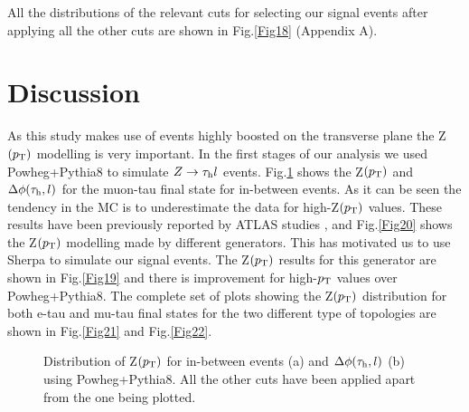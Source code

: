 All the distributions of the relevant cuts for selecting our signal events after applying all the other cuts are shown in Fig.\ref{Fig18} (Appendix A).
\section{Discussion}
As this study makes use of events highly boosted on the transverse plane the Z$(p_\text{T})$ modelling is very important. In the first stages of our analysis we used Powheg+Pythia8 to simulate $Z\to\tau_\text{h} l$ events. Fig.\ref{Fig23} shows the Z$(p_\text{T})$ and $\Delta\phi(\tau_\text{h},l)$ for the muon-tau final state for in-between events. As it can be seen the tendency in the MC is to underestimate the data for high-Z$(p_\text{T})$ values. These results have been previously reported by ATLAS studies \cite{Aad:2019wmn}, and Fig.\ref{Fig20} shows the Z$(p_\text{T})$ modelling made by different generators. This has motivated us to use Sherpa to simulate our signal events. The Z$(p_\text{T})$ results for this generator are shown in Fig.\ref{Fig19} and there is improvement for high-$p_\text{T}$ values over Powheg+Pythia8. The complete set of plots showing the Z$(p_\text{T})$ distribution for both e-tau and mu-tau final states for the two different type of topologies are shown in Fig.\ref{Fig21} and Fig.\ref{Fig22}.
\begin{figure}[H]
	\centering
	\hfill
	\caption{Distribution of Z$(p_\text{T})$ for in-between events (a) and $\Delta\phi(\tau_\text{h},l)$ (b) using Powheg+Pythia8. All the other cuts have been applied apart from the one being plotted.}
	\label{Fig23}
\end{figure}
